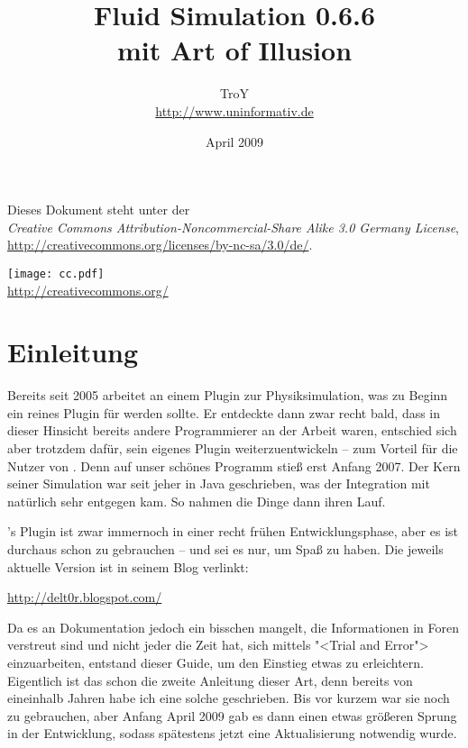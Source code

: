 \documentclass[12pt,a4paper]{scrartcl}
\begin{document}
\author{TroY \\ \url{http://www.uninformativ.de}}
\title{Fluid Simulation 0.6.6 \\ mit Art of Illusion}
\date{April 2009}
\maketitle
\thispagestyle{empty}

\vspace{100mm}

\begin{center}
	Dieses Dokument steht unter der \\
	\textit{Creative Commons Attribution-Noncommercial-Share Alike 3.0 Germany License}, \\
	\url{http://creativecommons.org/licenses/by-nc-sa/3.0/de/}.

	\texttt{[image: cc.pdf]} \\
	\url{http://creativecommons.org/}
\end{center}

\pagebreak


\tableofcontents
\thispagestyle{empty}
\pagebreak



\section{Einleitung}
Bereits seit 2005 arbeitet \deltor an einem Plugin zur Physiksimulation,
was zu Beginn ein reines Plugin für \blender werden sollte. Er entdeckte
dann zwar recht bald, dass in dieser Hinsicht bereits andere
Programmierer an der Arbeit waren, entschied sich aber trotzdem dafür,
sein eigenes Plugin weiterzuentwickeln -- zum Vorteil für die Nutzer von
\aoi. Denn auf unser schönes Programm stieß \deltor erst Anfang 2007.
Der Kern seiner Simulation war seit jeher in Java geschrieben, was der
Integration mit \aoi natürlich sehr entgegen kam. So nahmen die Dinge
dann ihren Lauf.

\deltor's Plugin ist zwar immernoch in einer recht frühen
Entwicklungsphase, aber es ist durchaus schon zu gebrauchen -- und sei
es nur, um Spaß zu haben. Die jeweils aktuelle Version ist in seinem
Blog verlinkt:

\url{http://delt0r.blogspot.com/}

Da es an Dokumentation jedoch ein bisschen mangelt, die Informationen in
Foren verstreut sind und nicht jeder die Zeit hat, sich mittels "<Trial
and Error"> einzuarbeiten, entstand dieser Guide, um den Einstieg etwas
zu erleichtern. Eigentlich ist das schon die zweite Anleitung dieser
Art, denn bereits von eineinhalb Jahren habe ich eine solche
geschrieben. Bis vor kurzem war sie noch zu gebrauchen, aber Anfang
April 2009 gab es dann einen etwas größeren Sprung in der Entwicklung,
sodass spätestens jetzt eine Aktualisierung notwendig wurde.
\end{document}
